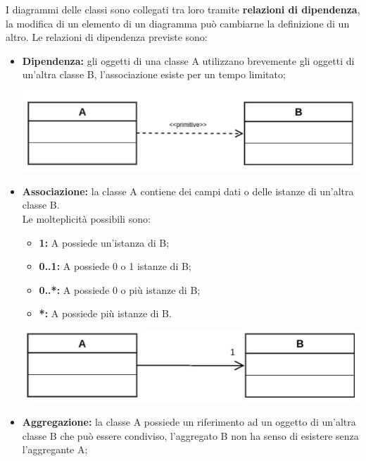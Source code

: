 I diagrammi delle classi sono collegati tra loro tramite \textbf{relazioni di dipendenza}, la modifica di un elemento di un diagramma può cambiarne la definizione di un altro.
Le relazioni di dipendenza previste sono:
	\begin{itemize}
		\item \textbf{Dipendenza:} gli oggetti di una classe A utilizzano brevemente gli oggetti di un'altra classe B, l'associazione esiste per un tempo limitato;
		\begin{center}
			\includegraphics[scale=0.4]{Immagini/UML/Dipendenza} \\
		\end{center}
		\item \textbf{Associazione:} la classe A contiene dei campi dati o delle istanze di un'altra classe B. \\ Le molteplicità possibili sono:
		\begin{itemize}
			\item \textbf{1:} A possiede un'istanza di B;
			\item \textbf{0..1:} A possiede 0 o 1 istanze di B;
			\item \textbf{0..*:} A possiede 0 o più istanze di B;
			\item \textbf{*:} A possiede più istanze di B.
		\end{itemize}
		\begin{center}
			\includegraphics[scale=0.4]{Immagini/UML/Associazione} \\
		\end{center}
		\item \textbf{Aggregazione:} la classe A possiede un riferimento ad un oggetto di un'altra classe B che può essere condiviso, l'aggregato B non ha senso di esistere senza l'aggregante A;
		\begin{center}

\end{center}
\end{itemize}
